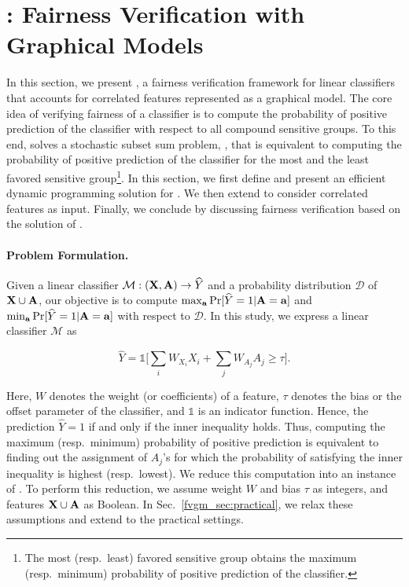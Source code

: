 \section{{\fvgm}: Fairness Verification with Graphical Models}\label{fvgm_sec:fvgm}

In this section, we present {\fvgm}, a fairness verification framework for linear classifiers that accounts for correlated features represented as a graphical model. The core idea of verifying fairness of a classifier is to compute the probability of positive prediction of the classifier with respect to all compound sensitive groups. To this end, {\fvgm} solves a stochastic subset sum problem, {\stochastic}, that is equivalent to computing the probability of positive prediction of the classifier for the most and the least favored sensitive group\footnote{The most (resp.\ least) favored sensitive group obtains the maximum (resp.\ minimum) probability of positive prediction of the classifier.}. In this section, we first define {\stochastic} and present an efficient dynamic programming solution for {\stochastic}. We then extend {\stochastic} to consider correlated features as input. Finally, we conclude by discussing fairness verification based on the solution of {\stochastic}.


\paragraph{Problem Formulation.}	
Given a linear classifier $ \mathcal{M}: (\mathbf{X}, \mathbf{A}) \rightarrow \widehat{Y} $ and a probability distribution $ \mathcal{D} $ of $ \mathbf{X} \cup \mathbf{A} $, our objective is to compute $ \max_{ \mathbf{a}} \Pr[\widehat{Y} =1 | \mathbf{A} = \mathbf{a}] $ and $ \min_{ \mathbf{a}} \Pr[\widehat{Y} =1 | \mathbf{A} = \mathbf{a}] $ with respect to $ \mathcal{D} $. In this study, we express a linear classifier $\mathcal{M}$ as 

\[	\widehat{Y} = \mathds{1}\Big[\sum_{i} W_{X_i}X_i + \sum_{j} W_{A_j}A_j \ge \tau\Big].\]

Here, $ W $ denotes the weight (or coefficients) of a feature, $ \tau $ denotes the bias or the offset parameter of the classifier, and $\mathds{1}$ is an indicator function. Hence, the prediction $ \widehat{Y} =1 $ if and only if the inner inequality holds.
Thus, computing the maximum (resp.\ minimum) probability of positive prediction is equivalent to finding out the assignment of $A_j$'s for which the probability of satisfying the inner inequality is highest (resp.\ lowest). We reduce this computation into an instance of {\stochastic}. To perform this reduction, we assume  weight $ W $ and bias $ \tau $ as integers, and features $\mathbf{X} \cup \mathbf{A} $ as Boolean. In Sec.~\ref{fvgm_sec:practical}, we relax these assumptions and extend to the practical settings. 

